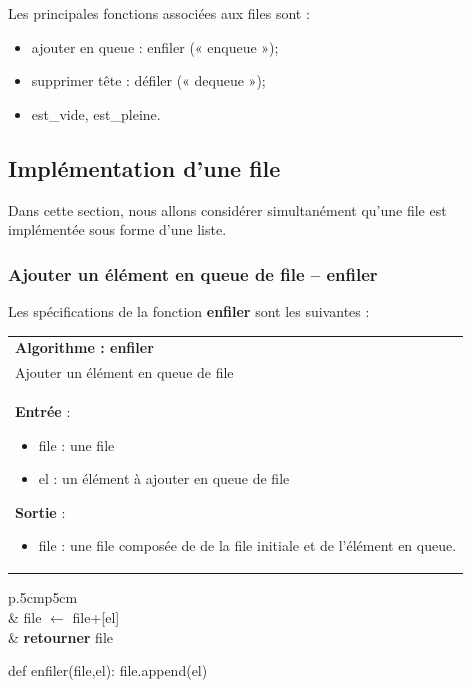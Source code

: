 \documentclass[10pt,fleqn]{article} %
\begin{document}
\begin{rem}
Les principales fonctions associées aux files sont : 
\begin{itemize}
\item ajouter en queue : enfiler (« enqueue »);
\item supprimer tête : défiler (« dequeue »);
\item est\_vide, est\_pleine.
\end{itemize}
\end{rem}


\subsection{Implémentation d'une file}
Dans cette section, nous allons considérer simultanément qu'une file est implémentée sous forme d'une liste. 

\subsubsection{Ajouter un élément en queue de file -- \textbf{enfiler}}
Les spécifications de la fonction \textbf{enfiler} sont les suivantes :

\begin{tabular}{p{\linewidth}}
\hline
\textbf{Algorithme : enfiler} \\
Ajouter un élément en queue de file \\
\hline
\textbf{Entrée} : 
\begin{itemize}
\item file : une file
\item el : un élément à ajouter en queue de file
\end{itemize}
\textbf{Sortie} : 
\begin{itemize}
\item file  : une file composée de de la file initiale et de l'élément en queue.
\end{itemize} \\
\hline 
\end{tabular}

\vspace{.5cm}

\noindent \begin{minipage}[c]{.48\linewidth}
\begin{pseudo}
\begin{tabular}{p{.5cm}p{5cm}}
\hline
{}  \\
& file $\leftarrow$ file+[el] \\
& \textbf{retourner} file \\
\hline
\end{tabular}
\end{pseudo}
\end{minipage}\hfill
\begin{minipage}[c]{.48\linewidth}
\begin{py}
\begin{python}
def enfiler(file,el):
    file.append(el)
\end{python}
\end{py}
\end{minipage}
\end{document}

